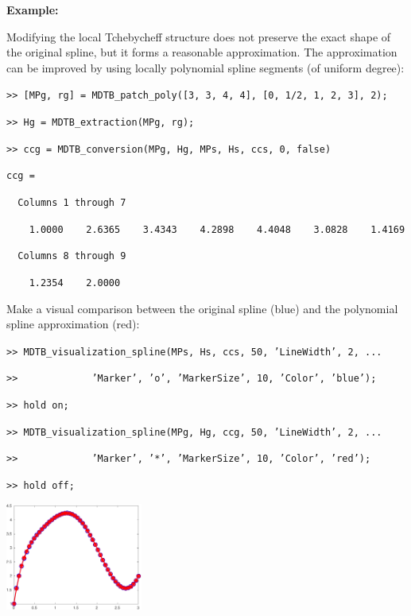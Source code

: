 \documentclass[10pt]{acmtrans2e}
\newenvironment{example}
{\vspace*{0.1cm}
\noindent \textbf{Example:} \vspace*{0.15cm}

\setlength{\parskip}{0.5ex plus 0.5exminus 0.2 ex}
}
{\medskip
}
\begin{document}
\begin{example}
\medskip
\noindent Modifying the local Tchebycheff structure does not preserve the exact shape of the original spline, but it forms a reasonable approximation. The approximation can be improved by using locally polynomial spline segments (of uniform degree):
\medskip

\texttt{>> [MPg, rg] = MDTB\_patch\_poly([3, 3, 4, 4], [0, 1/2, 1, 2, 3], 2);}

\texttt{>> Hg = MDTB\_extraction(MPg, rg);}

\pagebreak 

\texttt{>> ccg = MDTB\_conversion(MPg, Hg, MPs, Hs, ccs, 0, false)}

\texttt{ccg =}

\texttt{\ \ Columns 1 through 7}

\texttt{\ \ \ \ 1.0000\ \ \ \ 2.6365\ \ \ \ 3.4343\ \ \ \ 4.2898\ \ \ \ 4.4048\ \ \ \ 3.0828\ \ \ \ 1.4169}

\texttt{\ \ Columns 8 through 9}

\texttt{\ \ \ \ 1.2354\ \ \ \ 2.0000}

\medskip
\noindent Make a visual comparison between the original spline (blue) and the polynomial spline approximation (red):
\medskip

\texttt{>> MDTB\_visualization\_spline(MPs, Hs, ccs, 50, 'LineWidth', 2, ...}

\texttt{>>\ \ \ \ \ \ \ \ \ \ \ \ \ 'Marker', 'o', 'MarkerSize', 10, 'Color', 'blue');}

\texttt{>> hold on;}

\texttt{>> MDTB\_visualization\_spline(MPg, Hg, ccg, 50, 'LineWidth', 2, ...}

\texttt{>>\ \ \ \ \ \ \ \ \ \ \ \ \ 'Marker', '*', 'MarkerSize', 10, 'Color', 'red');}

\texttt{>> hold off;}

\begin{center}
  \includegraphics[width=4.5cm]{manual_ex_mdtbspline3}
\end{center}
\end{example}
\end{document}
